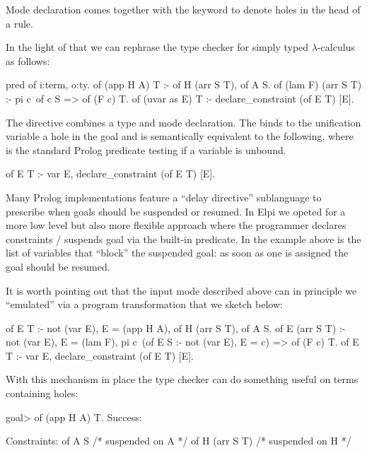 \documentclass[a4paper, 11pt]{book}
\begin{document}
Mode declaration comes together with the  keyword to denote
holes in the head of a rule.

In the light of that we can rephrase the type checker for simply typed $\lambda$-calculus
as follows:

\begin{elpicode}
pred of i:term, o:ty.
of (app H A) T :- of H (arr S T), of A S.
of (lam F) (arr S T) :- pi c\ of c S => of (F c) T.
of (uvar as E) T :- declare_constraint (of E T) [E].
\end{elpicode} 

The  directive combines a type and mode declaration.
The  binds to the unification variable 
a hole in the goal and is semantically equivalent to the following,
where  is the standard Prolog predicate testing if
a variable is unbound.
  
\begin{elpicode}
of E T :- var E, declare_constraint (of E T) [E].
\end{elpicode}

Many Prolog implementations feature a ``delay directive'' sublanguage to
prescribe when goals should be suspended or resumed. In Elpi we opeted for
a more low level but also more flexible approach where the programmer declares
constraints / suspends goal via  the  built-in
predicate. In the example above \elpiinline{[E]} is the list of variables
that ``block'' the suspended goal: as soon as one is assigned the goal should
be resumed.

It is worth pointing out that the input mode described above can in principle
we ``emulated'' via a program transformation that we sketch below:

\begin{elpicode}
of E T :- not (var E), E = (app H A), of H (arr S T), of A S.
of E (arr S T) :- not (var E), E = (lam F), pi c\ (of E S :- not (var E), E = c) => of (F c) T.
of E T :- var E, declare_constraint (of E T) [E].
\end{elpicode}

With this mechanism in place the type checker can do something useful
on terms containing holes:

\begin{elpicode}
goal> of (app H A) T.
Success:

Constraints:
  of A S  /* suspended on A */
  of H (arr S T)  /* suspended on H */
\end{elpicode}
\end{document}
